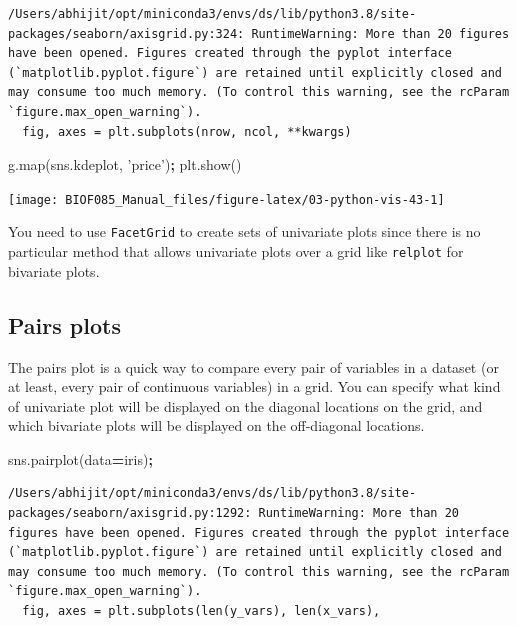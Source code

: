 \documentclass[
  letterpaper,
]{scrbook}
\newenvironment{Shaded}{\begin{snugshade}}{\end{snugshade}}
\newcommand{\BuiltInTok}[1]{#1}
\newcommand{\NormalTok}[1]{#1}
\newcommand{\OperatorTok}[1]{\textcolor[rgb]{0.81,0.36,0.00}{\textbf{#1}}}
\newcommand{\StringTok}[1]{\textcolor[rgb]{0.31,0.60,0.02}{#1}}
\begin{document}
\begin{verbatim}
/Users/abhijit/opt/miniconda3/envs/ds/lib/python3.8/site-packages/seaborn/axisgrid.py:324: RuntimeWarning: More than 20 figures have been opened. Figures created through the pyplot interface (`matplotlib.pyplot.figure`) are retained until explicitly closed and may consume too much memory. (To control this warning, see the rcParam `figure.max_open_warning`).
  fig, axes = plt.subplots(nrow, ncol, **kwargs)
\end{verbatim}

\begin{Shaded}
\begin{Highlighting}[]
\NormalTok{g.}\BuiltInTok{map}\NormalTok{(sns.kdeplot, }\StringTok{'price'}\NormalTok{)}\OperatorTok{;}
\NormalTok{plt.show()}
\end{Highlighting}
\end{Shaded}

\begin{center}\texttt{[image: BIOF085\_Manual\_files/figure-latex/03-python-vis-43-1]} \end{center}

You need to use \texttt{FacetGrid} to create sets of univariate plots since there is no particular method that allows univariate plots over a grid like \texttt{relplot} for bivariate plots.

\hypertarget{pairs-plots}{%
\subsection{Pairs plots}\label{pairs-plots}}

The pairs plot is a quick way to compare every pair of variables in a dataset (or at least, every pair of continuous variables) in a grid. You can specify what kind of univariate plot will be displayed on the diagonal locations on the grid, and which bivariate plots will be displayed on the off-diagonal locations.

\begin{Shaded}
\begin{Highlighting}[]
\NormalTok{sns.pairplot(data}\OperatorTok{=}\NormalTok{iris)}\OperatorTok{;}
\end{Highlighting}
\end{Shaded}

\begin{verbatim}
/Users/abhijit/opt/miniconda3/envs/ds/lib/python3.8/site-packages/seaborn/axisgrid.py:1292: RuntimeWarning: More than 20 figures have been opened. Figures created through the pyplot interface (`matplotlib.pyplot.figure`) are retained until explicitly closed and may consume too much memory. (To control this warning, see the rcParam `figure.max_open_warning`).
  fig, axes = plt.subplots(len(y_vars), len(x_vars),
\end{verbatim}
\end{document}
